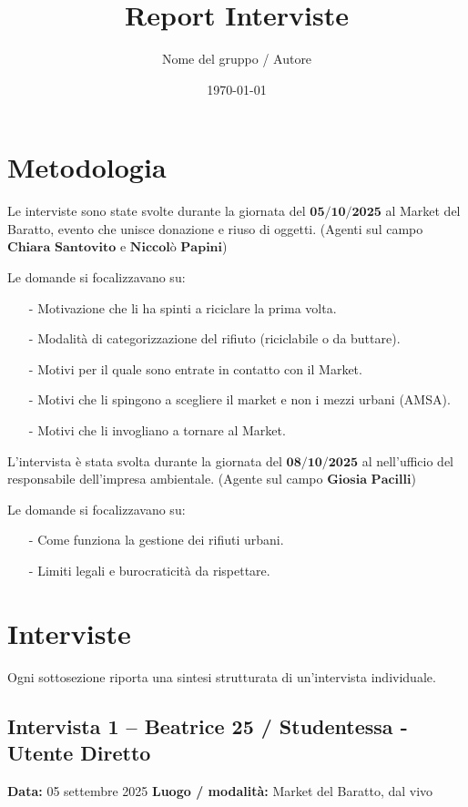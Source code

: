\documentclass[12pt,a4paper]{article}
\title{Report Interviste}
\author{Nome del gruppo / Autore}
\date{\today}
\begin{document}
\maketitle
\tableofcontents
\newpage

\section{Metodologia}
Le interviste sono state svolte durante la giornata del $\textbf{05/10/2025}$ al Market del Baratto, evento che unisce donazione e riuso di oggetti. (Agenti sul campo $\textbf{Chiara Santovito}$ e $\textbf{Niccolò Papini}$) 

Le domande si focalizzavano su:
\begin{itemize}
  \item [-] Motivazione che li ha spinti a riciclare la prima volta.
  \item [-] Modalità di categorizzazione del rifiuto (riciclabile o da buttare).
  \item [-] Motivi per il quale sono entrate in contatto con il Market.
  \item [-] Motivi che li spingono a scegliere il market e non i mezzi urbani (AMSA).
  \item [-] Motivi che li invogliano a tornare al Market.
\end{itemize}

L'intervista è stata svolta durante la giornata del $\textbf{08/10/2025}$ al nell'ufficio del responsabile dell'impresa ambientale. (Agente sul campo $\textbf{Giosia Pacilli}$) 

Le domande si focalizzavano su:
\begin{itemize}
  \item [-] Come funziona la gestione dei rifiuti urbani.
  \item [-] Limiti legali e burocraticità da rispettare.
\end{itemize}

\newpage


\section{Interviste}
Ogni sottosezione riporta una sintesi strutturata di un'intervista individuale.

\subsection{Intervista 1 – Beatrice 25 / Studentessa - Utente Diretto}
\textbf{Data:} 05 settembre 2025  
\textbf{Luogo / modalità:} Market del Baratto, dal vivo  
\end{document}
